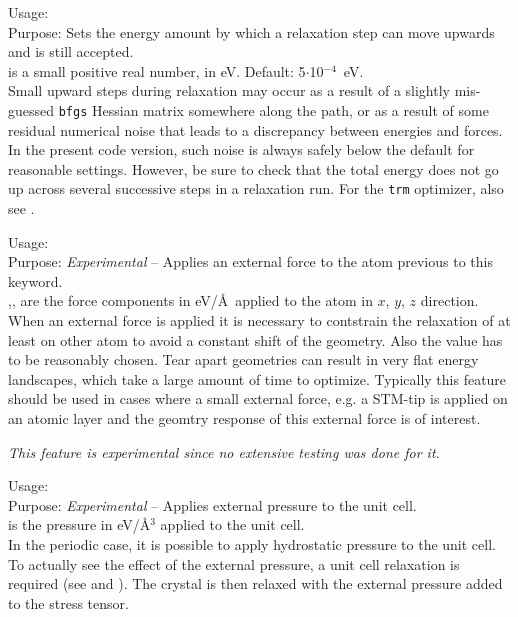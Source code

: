 {
  \noindent
  Usage:   \\[1.0ex]
  Purpose: Sets the energy amount by which a relaxation step can move
    upwards and is still accepted. \\[1.0ex]
   is a small positive real number, in eV. Default:
    5$\cdot$10$^{-4}$~eV. \\
}
Small upward steps during relaxation may occur as a result of a
slightly mis-guessed \texttt{bfgs} Hessian matrix somewhere
along the path, or
as a result of some residual numerical noise that leads to a
discrepancy between energies and forces. In the present code version,
such noise is always safely below the default  for
reasonable settings. However, be sure to check that
the total energy does not go up across several successive steps in
a relaxation run. For the \texttt{trm} optimizer, also see
.

{
  \noindent
  Usage:     \\[1.0ex]
  Purpose: \emph{Experimental} -- Applies an external force to the atom previous to this keyword.\\[1.0ex]
  ,, are the force components in eV/\AA\ applied to the atom in $x$, $y$, $z$ direction.\\
}
When an external force is applied it is necessary to contstrain the relaxation of at least on other atom to avoid a constant shift of the geometry. Also the value has to be reasonably chosen. Tear apart geometries can result in very flat energy landscapes, which take a large amount of time to optimize. Typically this feature should be used in cases where a small external force, e.g. a STM-tip is applied on an atomic layer and the geomtry response of this external force is of interest.

\emph{This feature is experimental since no extensive testing was done for it.}


{
  \noindent
  Usage:   \\[1.0ex]
  Purpose: \emph{Experimental} -- Applies external pressure to the unit cell.\\[1.0ex]
   is the pressure in eV/\AA$^3$ applied to the unit cell.\\
}
In the periodic case, it is possible to apply hydrostatic pressure to the unit cell.
To actually see the effect of the external pressure, a unit cell relaxation is required
(see  and ). The crystal is then
relaxed with the external pressure added to the stress tensor.

